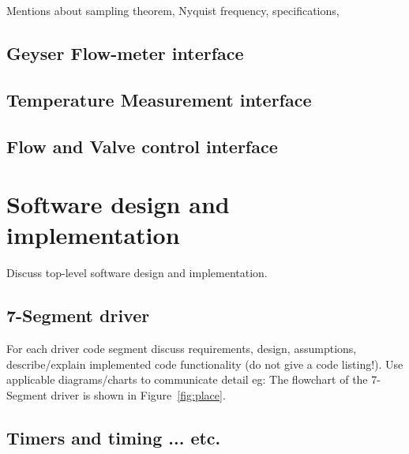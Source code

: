 \documentclass[11pt,a4paper]{article}
\begin{document}
Mentions about sampling theorem, Nyquist frequency, specifications, 




\subsection{Geyser Flow-meter interface}


\subsection{Temperature Measurement interface}


\subsection{Flow and Valve control interface}



\section{Software design and implementation}
Discuss top-level software design and implementation. 

\subsection{7-Segment driver}
For each driver code segment discuss requirements, design, assumptions, describe/explain implemented code functionality (do not give a code listing!). Use applicable diagrams/charts to communicate detail eg: The flowchart of the 7-Segment driver is shown in Figure~\ref{fig:place}.

\subsection{Timers and timing ... etc.}
\end{document}
